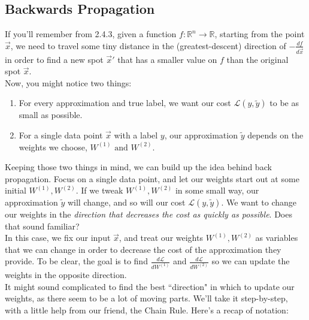 \documentclass{article}
\begin{document}
\subsection{Backwards Propagation}

If you'll remember from 2.4.3, given a function $f: \mathbb{R}^n \to \mathbb{R}$, starting from the point $\vec{x}$, we need to travel some tiny distance in the (greatest-descent) direction of $-\frac{df}{d\vec{x}}$ in order to find a new spot $\vec{x}'$ that has a smaller value on $f$ than the original spot $\vec{x}$. \\

Now, you might notice two things:
    \begin{enumerate}
        \item
        For every approximation and true label, we want our cost $\mathcal{L}(y, \tilde{y})$ to be as small as possible. 
        \item
        For a single data point $\vec{x}$ with a label $y$, our approximation $\tilde{y}$ depends on the weights we choose, $W^{(1)} \text{ and } W^{(2)}$.

    \end{enumerate}

Keeping those two things in mind, we can build up the idea behind back propagation. Focus on a single data point, and let our weights start out at some initial $W^{(1)}, W^{(2)}$. If we tweak $W^{(1)}, W^{(2)}$ in some small way, our approximation $\tilde{y}$ will change, and so will our cost $\mathcal{L}(y, \tilde{y})$. We want to change our weights in the \textit{direction that decreases the cost as quickly as possible}. Does that sound familiar?\\

In this case, we fix our input $\vec{x}$, and treat our weights $W^{(1)}, W^{(2)}$ as variables that we can change in order to decrease the cost of the approximation they provide. To be clear, the goal is to find $\frac{d\mathcal{L}}{d W^{(1)}}$ and $\frac{d\mathcal{L}}{d W^{(2)}}$ so we can update the weights in the opposite direction. \\

It might sound complicated to find the best ``direction" in which to update our weights, as there seem to be a lot of moving parts. We'll take it step-by-step, with a little help from our friend, the Chain Rule. Here's a recap of notation:\\

\end{document}
